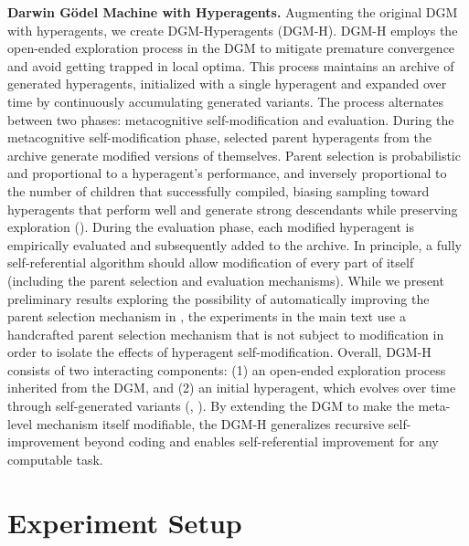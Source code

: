 \documentclass{article}
\begin{document}
\textbf{Darwin G\"odel Machine with Hyperagents.}
Augmenting the original DGM \citep{zhang2025darwin} with hyperagents, we create DGM-Hyperagents (DGM-H). DGM-H employs the open-ended exploration process in the DGM to mitigate premature convergence and avoid getting trapped in local optima. This process maintains an archive of generated hyperagents, initialized with a single hyperagent and expanded over time by continuously accumulating generated variants. The process alternates between two phases: metacognitive self-modification and evaluation. During the metacognitive self-modification phase, selected parent hyperagents from the archive generate modified versions of themselves. Parent selection is probabilistic and proportional to a hyperagent's performance, and inversely proportional to the number of children that successfully compiled, biasing sampling toward hyperagents that perform well and generate strong descendants while preserving exploration (). During the evaluation phase, each modified hyperagent is empirically evaluated and subsequently added to the archive. In principle, a fully self-referential algorithm should allow modification of every part of itself (including the parent selection and evaluation mechanisms). While we present preliminary results exploring the possibility of automatically improving the parent selection mechanism in , the experiments in the main text use a handcrafted parent selection mechanism that is not subject to modification in order to isolate the effects of hyperagent self-modification. Overall, DGM-H consists of two interacting components: (1) an open-ended exploration process inherited from the DGM, and (2) an initial hyperagent, which evolves over time through self-generated variants (, ). By extending the DGM to make the meta-level mechanism itself modifiable, the DGM-H generalizes recursive self-improvement beyond coding and enables self-referential improvement for any computable task.

\vspace{-0.5em}
\section{Experiment Setup}
\label{sec:exp-setup}
\vspace{-0.5em}
\end{document}
